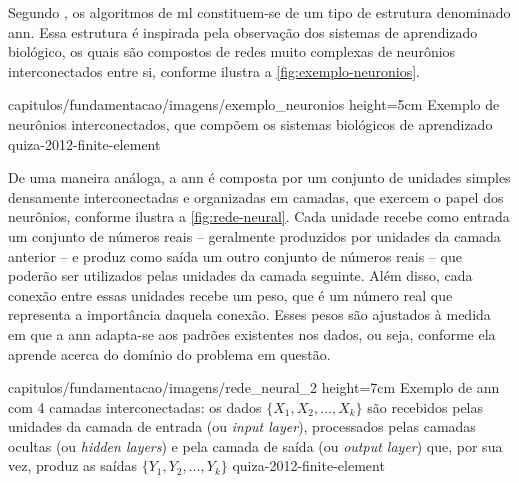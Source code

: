 


Segundo , os algoritmos de \acrshort{ml} constituem-se de um tipo de estrutura denominado \acrfull{ann}. Essa estrutura é inspirada pela observação dos sistemas de aprendizado biológico, os quais são compostos de redes muito complexas de neurônios interconectados entre si, conforme ilustra a \autoref{fig:exemplo-neuronios}.

    {capitulos/fundamentacao/imagens/exemplo_neuronios} %
    {height=5cm} %
    {Exemplo de neurônios interconectados, que compõem os sistemas biológicos de aprendizado} %
    {quiza-2012-finite-element} %

De uma maneira análoga, a \acrshort{ann} é composta por um conjunto de unidades simples densamente interconectadas e organizadas em camadas, que exercem o papel dos neurônios, conforme ilustra a \autoref{fig:rede-neural}.
Cada unidade recebe como entrada um conjunto de números reais -- geralmente produzidos por unidades da camada anterior -- e produz como saída um outro conjunto de números reais -- que poderão ser utilizados pelas unidades da camada seguinte.
Além disso, cada conexão entre essas unidades recebe um peso, que é um número real que representa a importância daquela conexão. Esses pesos são ajustados à medida em que a \acrshort{ann} adapta-se aos padrões existentes nos dados, ou seja, conforme ela aprende acerca do domínio do problema em questão.

    {capitulos/fundamentacao/imagens/rede_neural_2} %
    {height=7cm} %
    {Exemplo de \acrfull{ann} com 4 camadas interconectadas: os dados \(\{X_1, X_2, \dots, X_k\}\) são recebidos pelas unidades da camada de entrada (ou \textit{input layer}), processados pelas camadas ocultas (ou \textit{hidden layers}) e pela camada de saída (ou \textit{output layer}) que, por sua vez, produz as saídas \(\{Y_1, Y_2, \dots, Y_k\}\)} %
    {quiza-2012-finite-element} %


